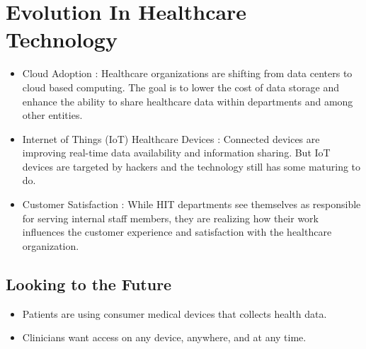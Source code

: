 \documentclass[12pt]{article}
\begin{document}
\section*{ Evolution  In Healthcare Technology  }
\begin{itemize}

\item Cloud Adoption : Healthcare organizations are shifting from data centers to cloud based computing. The goal is to lower the cost of data storage and enhance the ability to share healthcare data within departments and among other entities.

\item Internet of Things (IoT) Healthcare Devices : Connected devices are improving real-time data availability and information sharing. But IoT devices are targeted by hackers and the technology still has some maturing to do.




\item Customer Satisfaction : While HIT departments see themselves as responsible for serving internal staff members, they are realizing how their work influences the customer experience and satisfaction with the healthcare organization.

\end{itemize}

\subsection*{Looking to the Future}

\begin{itemize}

\item Patients are using consumer medical devices that collects health data.
\item Clinicians want access on any device, anywhere, and at any time.




\end{itemize}



   
   
   
   
   
\end{document}
